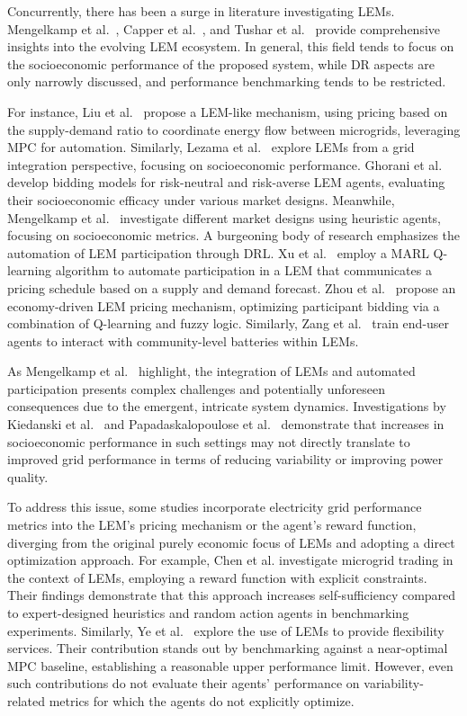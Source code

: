 \documentclass[preprint, 12pt]{elsarticle}
\begin{document}
Concurrently, there has been a surge in literature investigating LEMs. Mengelkamp et al.~\cite{Mengelkamp2019Review}, Capper et al.~\cite{CAPPER_LEM_Review}, and Tushar et al.~\cite{Tushar_LEM_Review} provide comprehensive insights into the evolving LEM ecosystem. In general, this field tends to focus on the socioeconomic performance of the proposed system, while DR aspects are only narrowly discussed, and performance benchmarking tends to be restricted.

For instance, Liu et al.~\cite{Liu_LEM_Article} propose a LEM-like mechanism, using pricing based on the supply-demand ratio to coordinate energy flow between microgrids, leveraging MPC for automation.
Similarly, Lezama et al.~\cite{Lezama_LEM} explore LEMs from a grid integration perspective, focusing on socioeconomic performance.
Ghorani et al.~\cite{Ghorani_NoDRL_LEM_Article} develop bidding models for risk-neutral and risk-averse LEM agents, evaluating their socioeconomic efficacy under various market designs.
Meanwhile, Mengelkamp et al.~\cite{Mengelkamp_NoDRL_LEM_Article} investigate different market designs using heuristic agents, focusing on socioeconomic metrics.
A burgeoning body of research emphasizes the automation of LEM participation
through DRL.
Xu et al.~\cite{Xu_LEM_Article} employ a MARL Q-learning algorithm to automate participation in a LEM that communicates a pricing schedule based on a supply and demand forecast.
Zhou et al.~\cite{Zhou_LEM_Article} propose an economy-driven LEM pricing mechanism, optimizing participant bidding via a combination of Q-learning and fuzzy logic.
Similarly, Zang et al.~\cite{Zang_LEM_Article} train end-user agents to interact with community-level batteries within LEMs.

As Mengelkamp et al.~\cite{Mengelkamp_NoDRL_LEM_Article} highlight, the integration of LEMs and automated participation presents complex challenges and potentially unforeseen consequences due to the emergent, intricate system dynamics.
Investigations by Kiedanski et al.~\cite{Kiedanski_LEM_Lit_Issues} and Papadaskalopoulose et al.~\cite{Papadaskalopoulos_LEM_Lit_Issues} demonstrate that increases in socioeconomic performance in such settings may not directly translate to improved grid performance in terms of reducing variability or improving power quality.

To address this issue, some studies incorporate electricity grid performance metrics into the LEM's pricing mechanism or the agent's reward function, diverging from the original purely economic focus of LEMs and adopting a direct optimization approach. For example, Chen et al.\cite{Chen_LEMDRL_Article} investigate microgrid trading in the context of LEMs, employing a reward function with explicit constraints. Their findings demonstrate that this approach increases self-sufficiency compared to expert-designed heuristics and random action agents in benchmarking experiments. Similarly, Ye et al.~\cite{Ye_LEM_2} explore the use of LEMs to provide flexibility services. Their contribution stands out by benchmarking against a near-optimal MPC baseline, establishing a reasonable upper performance limit. However, even such contributions do not evaluate their agents' performance on variability-related metrics for which the agents do not explicitly optimize.
\end{document}
